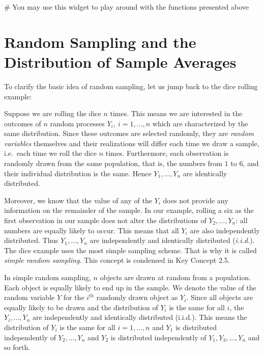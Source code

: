 \documentclass[]{book}
\theoremstyle{definition}
\theoremstyle{definition}
\theoremstyle{definition}
\theoremstyle{remark}
\begin{document}
 \# You may use this widget to play around with the functions presented
above

\section{Random Sampling and the Distribution of Sample
Averages}\label{RSATDOSA}

To clarify the basic idea of random sampling, let us jump back to the
dice rolling example:

Suppose we are rolling the dice \(n\) times. This means we are
interested in the outcomes of \(n\) random processes
\(Y_i, \ i=1,...,n\) which are characterized by the same distribution.
Since these outcomes are selected randomly, they are \emph{random
variables} themselves and their realizations will differ each time we
draw a sample, i.e.~each time we roll the dice \(n\) times. Furthermore,
each observation is randomly drawn from the same population, that is,
the numbers from \(1\) to \(6\), and their individual distribution is
the same. Hence \(Y_1,\dots,Y_n\) are identically distributed.

Moreover, we know that the value of any of the \(Y_i\) does not provide
any information on the remainder of the sample. In our example, rolling
a six as the first observation in our sample does not alter the
distributions of \(Y_2,\dots,Y_n\): all numbers are equally likely to
occur. This means that all \(Y_i\) are also independently distributed.
Thus \(Y_1,\dots,Y_n\) are independently and identically distributed
(\emph{i.i.d.}). The dice example uses the most simple sampling scheme.
That is why it is called \emph{simple random sampling}. This concept is
condensed in Key Concept 2.5.

\begin{keyconcepts}{2.5}
In simple random sampling, $n$ objects are drawn at random from a population. Each object is equally likely to end up in the sample. We denote the value of the random variable $Y$ for the $i^{th}$ randomly drawn object as $Y_i$.  Since all objects are equally likely to be drawn and the distribution of $Y_i$ is the same for all $i$, the $Y_i, \dots, Y_n$ are independently and identically distributed (i.i.d.). This means the distribution of $Y_i$ is the same for all $i=1,\dots,n$ and $Y_1$ is distributed independently of $Y_2, \dots, Y_n$ and $Y_2$ is distributed independently of $Y_1, Y_3, \dots, Y_n$ and so forth.
\end{keyconcepts}
\end{document}
